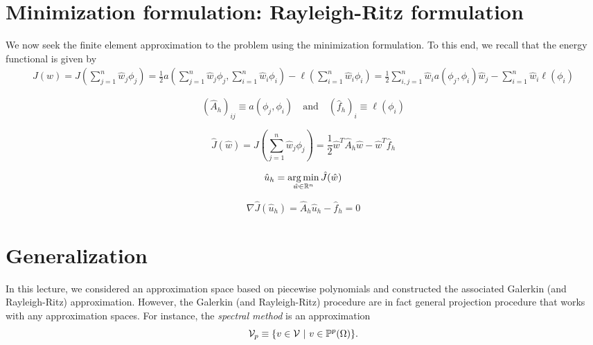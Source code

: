 \section{Minimization formulation: Rayleigh-Ritz formulation}
We now seek the finite element approximation to the problem using the minimization formulation. To this end, we recall that the energy functional is given by 
\begin{align*}
  J(w) =  J(\sum_{j=1}^n \hat w_j \phi_j)
  = \frac{1}{2} a (\sum_{j=1}^n \hat w_j \phi_j, \sum_{i=1}^n \hat w_i \phi_i) - \ell(\sum_{i=1}^n \hat w_i \phi_i)
  = \frac{1}{2} \sum_{i,j=1}^n \hat w_i a(\phi_j,\phi_i) \hat w_j - \sum_{i=1}^n \hat w_i \ell(\phi_i)
\end{align*}

\begin{equation*}
  (\hat A_h)_{ij} \equiv a(\phi_j,\phi_i)
  \quad \text{and} \quad
  (\hat f_h)_i \equiv \ell(\phi_i)
\end{equation*}

\begin{equation*}
  \hat J(\hat w) = J(\sum_{j=1}^n \hat w_j \phi_j)
  = \frac{1}{2} \hat w^T \hat A_h \hat w - \hat w^T \hat f_h
\end{equation*}

\begin{equation*}
  \hat u_h = \operatorname*{arg\,min}_{\hat w \in \mathbb{R}^n} \hat J(\hat w)
\end{equation*}

\begin{equation*}
  \nabla \hat J(\hat u_h) = \hat A_h \hat u_h - \hat f_h = 0
\end{equation*}

\section{Generalization}
In this lecture, we considered an approximation space based on piecewise polynomials and constructed the associated Galerkin (and Rayleigh-Ritz) approximation. However, the Galerkin (and Rayleigh-Ritz) procedure are in fact general projection procedure that works with any approximation spaces. For instance, the \emph{spectral method} is an approximation 
\begin{equation*}
  \mathcal{V}_p \equiv \{ v \in \mathcal{V} \ | \ v \in \mathbb{P}^p(\Omega) \}.
\end{equation*}
